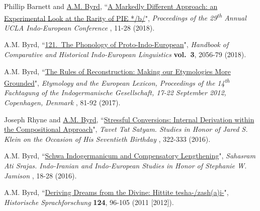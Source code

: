 \documentclass[paper=letter,fontsize=11pt,enabledeprecatedfontcommands]{scrartcl} %
\newcommand{\PaperEntry}[7]{
		\noindent #1, ``\href{#7}{#2}", \textit{#3} \textbf{#4}, #5 (#6).}
\begin{document}
\begin{etaremune}
\item \PaperEntry{Phillip Barnett and \underline{A.M. Byrd}}{A Markedly Different Approach: an Experimental Look at the Rarity of PIE */b/}{Proceedings of the 29\textsuperscript{th} Annual UCLA Indo-European Conference}{\hspace{-.35em}}{11-28}{2018}{http://box2018.temp.domains/~speakjb5/wp-content/uploads/2018/03/Barnett-Byrd-A-Markedly-Different-Approach.pdf}

\item \PaperEntry{A.M. Byrd}{121.~The Phonology of Proto-Indo-European}{Handbook of Comparative and Historical Indo-European Linguistics}{vol.~3}{2056-79}{2018}{https://www.degruyter.com/view/product/487972} 

\item \PaperEntry{A.M. Byrd}{The Rules of Reconstruction: Making our Etymologies More Grounded}{Etymology and the European Lexicon, Proceedings of the 14\textsuperscript{th} Fachtagung of the Indogermanische Gesellschaft, 17-22 September 2012, Copenhagen, Denmark}{\hspace{-.35em}}{81-92}{2017}{https://reichert-verlag.de/buchreihen/sprachwissenschaft_reihen/sprachwissenschaft_akten_der_fachtagung_der_indogermanischen_gesellschaft/9783954902026_etymology_and_the_european_lexicon-detail} 

\item \PaperEntry{Joseph Rhyne and \underline{A.M. Byrd}}{Stressful Conversions: Internal Derivation within the Compositional Approach}{Tavet Tat Satyam. Studies in Honor of Jared S. Klein on the Occasion of His Seventieth Birthday}{\hspace{-.35em}}{322-333}{2016}{http://www.beechstave.com/tavet.htm}

\item \PaperEntry{A.M. Byrd}{Schwa Indogermanicum and Compensatory Lengthening}{Sahasram Ati Srajas. Indo-Iranian and Indo-European Studies in Honor of Stephanie W. Jamison}{\hspace{-.35em}}{18-28}{2016}{http://www.beechstave.com/sahas.htm}

\item \PaperEntry{A.M. Byrd}{Deriving Dreams from the Divine: Hittite tesha-/zash(a)i-}{Historische Sprachforschung}{124}{96-105}{2011 [2012]}{http://rootsofeurope.ku.dk/english/activities/sound_of_indo-european/}


\end{etaremune}
\end{document}
